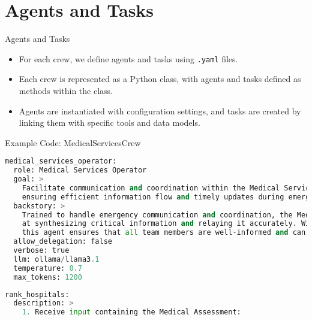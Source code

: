 \section{Agents and Tasks}
\begin{frame}{Agents and Tasks}
    \begin{itemize}
        \item For each crew, we define agents and tasks using \texttt{.yaml} files.
        \item Each crew is represented as a Python class, with agents and tasks defined as methods within the class.
        \item Agents are instantiated with configuration settings, and tasks are created by linking them with specific tools and data models.
    \end{itemize}
    \begin{block}{Example Code: MedicalServicesCrew}
        \begin{minipage}[t]{0.48\textwidth} %
            \centering
            \begin{lstlisting}[language=Python, breaklines=true]
medical_services_operator:
  role: Medical Services Operator
  goal: >
    Facilitate communication and coordination within the Medical Services crew and with other crews,
    ensuring efficient information flow and timely updates during emergencies.
  backstory: >
    Trained to handle emergency communication and coordination, the Medical Services Operator excels
    at synthesizing critical information and relaying it accurately. With a background in crisis management,
    this agent ensures that all team members are well-informed and can act swiftly.
  allow_delegation: false
  verbose: true
  llm: ollama/llama3.1
  temperature: 0.7
  max_tokens: 1200
            \end{lstlisting}
        \end{minipage}
        \hfill %
        \begin{minipage}[t]{0.48\textwidth} %
            \centering
            \begin{lstlisting}[language=Python, breaklines=true]
rank_hospitals:
  description: >
    1. Receive input containing the Medical Assessment:
            \end{lstlisting}
        \end{minipage}
    \end{block}
\end{frame}
